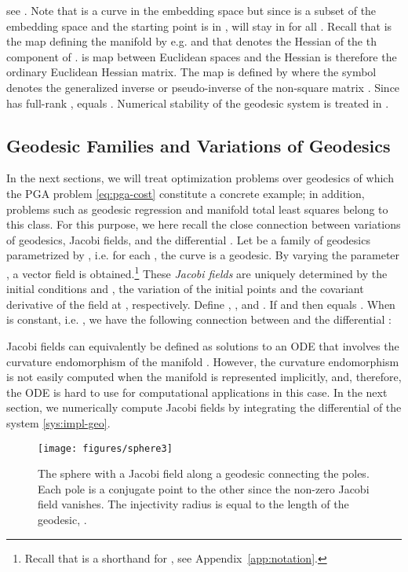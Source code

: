 \documentclass[final]{svjour3}
\begin{document}
see \cite{dedieu_symplectic_2005}. Note that  is a curve in the embedding
space  but since  is a subset of the embedding space and the starting
point  is in ,  will stay in  for all .
Recall that  is the map defining the manifold by
e.g.  and that  denotes the Hessian of the th
component of .  is map between Euclidean spaces and the Hessian is
therefore the ordinary Euclidean Hessian matrix. 
The map  is defined by
 where
the symbol  denotes the generalized inverse or pseudo-inverse
of the non-square matrix . Since  has full-rank ,  equals
. Numerical stability of the geodesic
system is treated in \cite{dedieu_symplectic_2005}.

\subsection{Geodesic Families and Variations of Geodesics}
In the next sections, we will treat optimization problems over geodesics of which 
the PGA problem \eqref{eq:pga-cost} constitute a concrete example;
in addition, problems such as geodesic regression \cite{fletcher_geodesic_2011} and
manifold total least squares belong to this class.
For this purpose, we here recall the close connection between variations of geodesics,
Jacobi fields, and the differential . 
Let  be a family of geodesics parametrized by , i.e. for each
, the curve  is a geodesic. 
By varying the parameter , a vector field  is obtained.\footnote{
Recall that  is a shorthand for
, see Appendix~\ref{app:notation}.}
These \emph{Jacobi fields} are uniquely determined by 
the initial conditions  and , the variation of the initial
points  and the covariant derivative of the field at , respectively. Define 
, , and
. If  and  then 
 equals  \cite[Chap.
5]{do_carmo_riemannian_1992}. When 
is constant, i.e. , we have the following connection between  and
the differential :

Jacobi fields can equivalently be defined as solutions to an ODE that involves
the curvature endomorphism of the manifold \cite[Chap.
5]{do_carmo_riemannian_1992}.  However, the curvature
endomorphism is not easily computed when the manifold is represented implicitly,
and, therefore, the ODE is hard to use for computational applications in this
case. In the next section, we
numerically compute Jacobi fields by integrating the
differential of the system \eqref{sys:impl-geo}.
\begin{figure}[h]
    \begin{center}
      \texttt{[image: figures/sphere3]}
    \end{center}
    \caption{The sphere  with a Jacobi field along a geodesic connecting
    the poles. Each pole is a conjugate point to the other since the non-zero Jacobi
    field vanishes. The injectivity radius is equal to the length of the
    geodesic, .}
    \label{fig:sphere-jacobi}
\end{figure}
\end{document}
